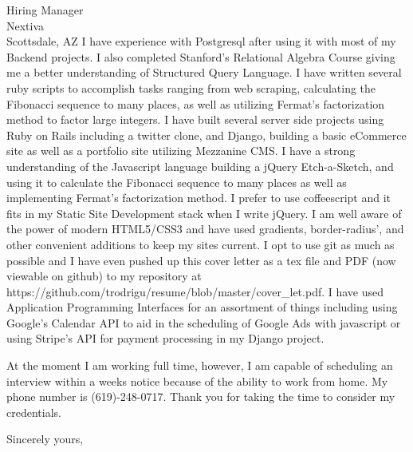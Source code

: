 \documentclass{letter} %
\begin{document}
\begin{letter}{
Hiring Manager \\
Nextiva \\
Scottsdale, AZ}
\noindent I have experience with Postgresql after using it with most of my Backend projects.  I also completed Stanford's Relational Algebra Course giving me a better understanding of Structured Query Language.  I have written several ruby scripts to accomplish tasks ranging from web scraping, calculating the Fibonacci sequence to many places, as well as utilizing Fermat's factorization method to factor large integers.  I have built several server side projects using Ruby on Rails including a twitter clone, and Django, building a basic eCommerce site as well as a portfolio site utilizing Mezzanine CMS.  I have a strong understanding of the Javascript language building a jQuery Etch-a-Sketch, and using it to calculate the Fibonacci sequence to many places as well as implementing Fermat's factorization method.  I prefer to use coffeescript and it fits in my Static Site Development stack when I write jQuery.  I am well aware of the power of modern HTML5/CSS3 and have used gradients, border-radius', and other convenient additions to keep my sites current.  I opt to use git as much as possible and I have even pushed up this cover letter as a tex file and PDF (now viewable on github) to my repository at https://github.com/trodrigu/resume/blob/master/cover\_let.pdf.  I have used Application Programming Interfaces for an assortment of things including using Google's Calendar API to aid in the scheduling of Google Ads with javascript or using Stripe's API for payment processing in my Django project.
 

\noindent At the moment I am working full time, however, I am capable of scheduling an interview within a weeks notice because of the ability to work from home.  My phone number is (619)-248-0717.  Thank you for taking the time to consider my credentials.
 
\closing{Sincerely yours,} 
 

 

\end{letter}
 
\end{document}
